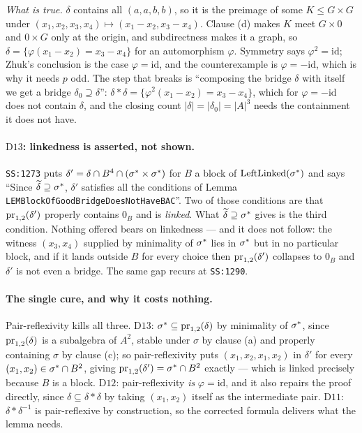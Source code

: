 \emph{What is true.} $\delta$ contains all $(a,a,b,b)$, so it is the preimage
of some $K\le G\times G$ under $(x_{1},x_{2},x_{3},x_{4})\mapsto
(x_{1}-x_{2},x_{3}-x_{4})$. Clause (d) makes $K$ meet $G\times 0$ and
$0\times G$ only at the origin, and subdirectness makes it a graph, so
$\delta=\{\varphi(x_{1}-x_{2})=x_{3}-x_{4}\}$ for an automorphism $\varphi$.
Symmetry says $\varphi^{2}=\mathrm{id}$; Zhuk's conclusion is the case
$\varphi=\mathrm{id}$, and the counterexample is $\varphi=-\mathrm{id}$, which
is why it needs $p$ odd. The step that breaks is ``composing the bridge
$\delta$ with itself we get a bridge $\delta_{0}\supseteq\delta$'':
$\delta\ast\delta=\{\varphi^{2}(x_{1}-x_{2})=x_{3}-x_{4}\}$, which for
$\varphi=-\mathrm{id}$ does not contain $\delta$, and the closing count
$|\delta|=|\delta_{0}|=|A|^{3}$ needs the containment it does not have.

\paragraph{$\mathrm D{13}$: linkedness is asserted, not shown.}
\texttt{SS:1273} puts $\delta'=\delta\cap B^{4}\cap(\sigma^{*}\times
\sigma^{*})$ for $B$ a block of $\operatorname{LeftLinked}(\sigma^{*})$ and
says ``Since $\widetilde{\delta}\supseteq\sigma^{*}$, $\delta'$ satisfies all the
conditions of Lemma \texttt{LEMBlockOfGoodBridgeDoesNotHaveBAC}''. Two of those
conditions are that $\operatorname*{pr}_{1,2}(\delta')$ properly contains $0_{B}$ and is
\emph{linked}. What $\widetilde{\delta}\supseteq\sigma^{*}$ gives is the third
condition. Nothing offered bears on linkedness --- and it does not follow: the
witness $(x_{3},x_{4})$ supplied by minimality of $\sigma^{*}$ lies in
$\sigma^{*}$ but in no particular block, and if it lands outside $B$ for
every choice then $\operatorname*{pr}_{1,2}(\delta')$ collapses to $0_{B}$ and $\delta'$ is
not even a bridge. The same gap recurs at \texttt{SS:1290}.

\paragraph{The single cure, and why it costs nothing.}
Pair-reflexivity kills all three. $\mathrm D{13}$: $\sigma^{*}\subseteq
\operatorname*{pr}_{1,2}(\delta)$ by minimality of $\sigma^{*}$, since $\operatorname*{pr}_{1,2}(\delta)$
is a subalgebra of $A^{2}$, stable under $\sigma$ by clause (a) and properly
containing $\sigma$ by clause (c); so pair-reflexivity puts
$(x_{1},x_{2},x_{1},x_{2})$ in $\delta'$ for every
$(x_{1},x_{2})\in\sigma^{*}\cap B^{2}$, giving $\operatorname*{pr}_{1,2}(\delta')=
\sigma^{*}\cap B^{2}$ exactly --- which is linked precisely because $B$ is a
block. $\mathrm D{12}$: pair-reflexivity \emph{is} $\varphi=\mathrm{id}$, and it
also repairs the proof directly, since $\delta\subseteq\delta\ast\delta$ by
taking $(x_{1},x_{2})$ itself as the intermediate pair. $\mathrm D{11}$:
$\delta\ast\delta^{-1}$ is pair-reflexive by construction, so the corrected
formula delivers what the lemma needs.

